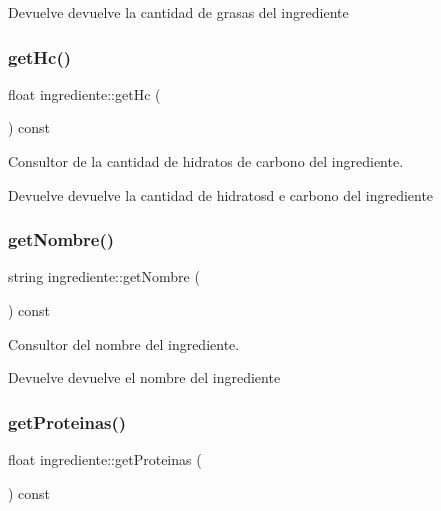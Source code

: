 \begin{DoxyReturn}{Devuelve}
devuelve la cantidad de grasas del ingrediente 
\end{DoxyReturn}
\mbox{\label{classingrediente_a25b3b1bb017318d0aa9274484be7bc7a}} 
\subsubsection{\texorpdfstring{get\+Hc()}{getHc()}}
{\footnotesize\ttfamily float ingrediente\+::get\+Hc (\begin{DoxyParamCaption}{ }\end{DoxyParamCaption}) const}



Consultor de la cantidad de hidratos de carbono del ingrediente. 

\begin{DoxyReturn}{Devuelve}
devuelve la cantidad de hidratosd e carbono del ingrediente 
\end{DoxyReturn}
\mbox{\label{classingrediente_a8da227d03af8811627434703922b463a}} 
\subsubsection{\texorpdfstring{get\+Nombre()}{getNombre()}}
{\footnotesize\ttfamily string ingrediente\+::get\+Nombre (\begin{DoxyParamCaption}{ }\end{DoxyParamCaption}) const}



Consultor del nombre del ingrediente. 

\begin{DoxyReturn}{Devuelve}
devuelve el nombre del ingrediente 
\end{DoxyReturn}
\mbox{\label{classingrediente_a64258034d6cf7c70cb496dc91c7ab0fa}} 
\subsubsection{\texorpdfstring{get\+Proteinas()}{getProteinas()}}
{\footnotesize\ttfamily float ingrediente\+::get\+Proteinas (\begin{DoxyParamCaption}{ }\end{DoxyParamCaption}) const}



